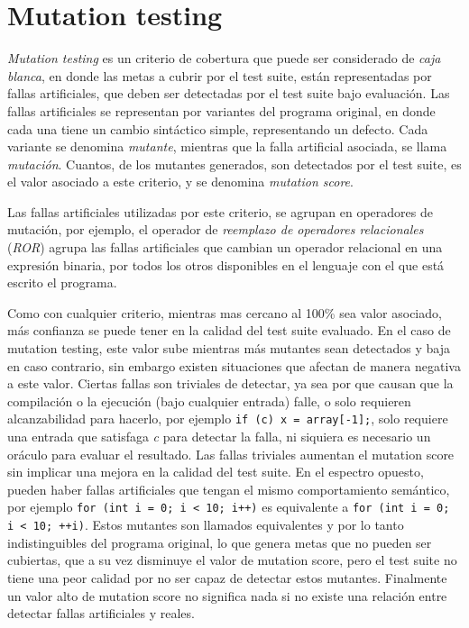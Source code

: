 \chapter[Mutation]{Mutation testing}
\label{sec:preliminares.mutation}

\emph{Mutation testing} es un criterio de cobertura que puede ser considerado de \emph{caja blanca}, en donde las metas a cubrir por el test suite, est\'an representadas por fallas artificiales, que deben ser detectadas por el test suite bajo evaluaci\'on. Las fallas artificiales se representan por variantes del programa original, en donde cada una tiene un cambio sint\'actico simple, representando un defecto. Cada variante se denomina \emph{mutante}, mientras que la falla artificial asociada, se llama \emph{mutaci\'on}. Cuantos, de los mutantes generados, son detectados por el test suite, es el valor asociado a este criterio, y se denomina \emph{mutation score}.

Las fallas artificiales utilizadas por este criterio, se agrupan en operadores de mutaci\'on, por ejemplo, el operador de \emph{reemplazo de operadores relacionales} (\emph{ROR}) agrupa las fallas artificiales que cambian un operador relacional en una expresi\'on binaria, por todos los otros disponibles en el lenguaje con el que est\'a escrito el programa.

Como con cualquier criterio, mientras mas cercano al 100\% sea valor asociado, m\'as confianza se puede tener en la calidad del test suite evaluado. En el caso de mutation testing, este valor sube mientras m\'as mutantes sean detectados y baja en caso contrario, sin embargo existen situaciones que afectan de manera negativa a este valor. Ciertas fallas son triviales de detectar, ya sea por que causan que la compilaci\'on o la ejecuci\'on (bajo cualquier entrada) falle, o solo requieren alcanzabilidad para hacerlo, por ejemplo \lstinline|if (c) x = array[-1];|, solo requiere una entrada que satisfaga \emph{c} para detectar la falla, ni siquiera es necesario un or\'aculo para evaluar el resultado. Las fallas triviales aumentan el mutation score sin implicar una mejora en la calidad del test suite. En el espectro opuesto, pueden haber fallas artificiales que tengan el mismo comportamiento sem\'antico, por ejemplo \lstinline|for (int i = 0; i < 10; i++)| es equivalente a \lstinline|for (int i = 0; i < 10; ++i)|. Estos mutantes son llamados equivalentes y por lo tanto indistinguibles del programa original, lo que genera metas que no pueden ser cubiertas, que a su vez disminuye el valor de mutation score, pero el test suite no tiene una peor calidad por no ser capaz de detectar estos mutantes. Finalmente un valor alto de mutation score no significa nada si no existe una relaci\'on entre detectar fallas artificiales y reales.

